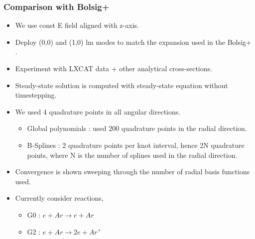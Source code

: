 \documentclass[mathserif, aspectratio=169]{beamer}
\begin{document}
\begin{frame}
	\frametitle{Comparison with Bolsig+}
	\begin{itemize}
		\item We use const E field aligned with z-axis. 
		\item Deploy (0,0) and (1,0) lm modes to match the expansion used in the Bolsig+ .
		\item Experiment with LXCAT data + other analytical cross-sections. 
		\item Steady-state solution is computed with steady-state equation without timestepping. 
		\item We used 4 quadrature points in all angular directions. 
		\begin{itemize}
			\item Global polynomials : used 200 quadrature points in the radial direction. 
			\item B-Splines : 2 quadrature points per knot interval, hence 2N quadrature points, where N is the number of splines used in the radial direction. 
		\end{itemize}
		\item Convergence is shown sweeping through the number of radial basis functions used. 
		\item Currently consider reactions, 
		\begin{itemize}
			\item G0 : $e + Ar \rightarrow e + Ar$
			\item G2 : $e + Ar \rightarrow 2e + Ar^+$
		\end{itemize}
	\end{itemize}
\end{frame}
\end{document}
